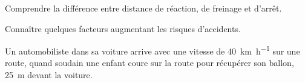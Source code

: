 \tetePremStssRout
\vspace*{-36pt}


\begin{objectifs}
  \item Comprendre la différence entre distance de réaction, de freinage et d'arrêt.
  \item Connaître quelques facteurs augmentant les risques d'accidents.
\end{objectifs}

\begin{contexte}
  Un automobiliste dans sa voiture arrive avec une vitesse de \qty{40}{\km\per\hour} sur une route, quand soudain une enfant coure sur la route pour récupérer son ballon, \qty{25}{\m} devant la voiture.
  
\end{contexte}


